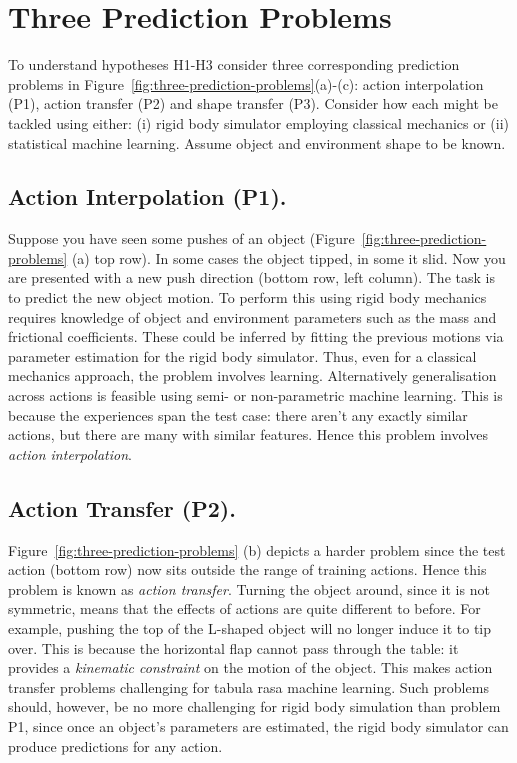 \section{Three Prediction Problems	}
\label{sec:schema}

To understand hypotheses H1-H3 consider three corresponding prediction problems in Figure~\ref{fig:three-prediction-problems}(a)-(c): action interpolation (P1), action transfer (P2) and shape transfer (P3). Consider how each might be tackled using either: (i) rigid body simulator employing classical mechanics or (ii) statistical machine learning. Assume object and environment shape to be known.

\subsection{Action Interpolation (P1).} Suppose you have seen some pushes of an object (Figure~\ref{fig:three-prediction-problems} (a) top row). In some cases the object tipped, in some it slid. Now you are presented with a new push direction (bottom row, left column). The task is to predict the new object motion. To perform this using rigid body mechanics requires knowledge of object and environment parameters such as the mass and frictional coefficients. These could be inferred by fitting the previous motions via parameter estimation for the rigid body simulator. Thus, even for a classical mechanics approach, the problem involves learning. Alternatively generalisation across actions is feasible using semi- or non-parametric machine learning. This is because the experiences span the test case: there aren't any exactly similar actions, but there are many with similar features. Hence this problem involves {\em action interpolation}.

\subsection{Action Transfer (P2).} Figure~\ref{fig:three-prediction-problems} (b) depicts a harder problem since the test action (bottom row) now sits outside the range of training actions. Hence this problem is known as {\em action transfer}. Turning the object around, since it is not symmetric, means that the effects of actions are quite different to before. For example, pushing the top of the L-shaped object will no longer induce it to tip over. This is because the horizontal flap cannot pass through the table: it provides a {\em kinematic constraint} on the motion of the object. This makes action transfer problems challenging for tabula rasa machine learning. Such problems should, however, be no more challenging for rigid body simulation than problem P1, since once an object's parameters are estimated, the rigid body simulator can produce predictions for any action.

